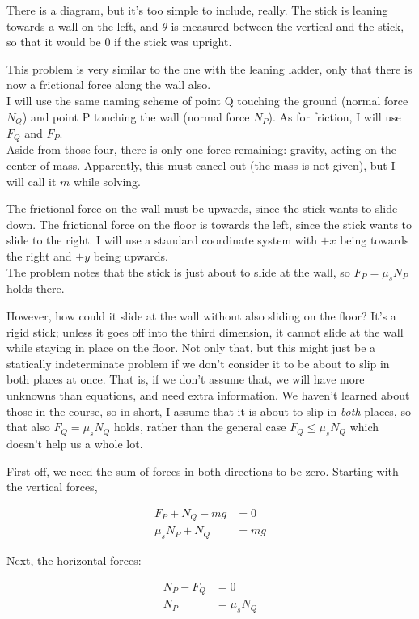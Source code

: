 \documentclass[8.01x]{subfiles}
\begin{document}
There is a diagram, but it's too simple to include, really. The stick is leaning towards a wall on the left, and $\theta$ is measured between the vertical and the stick, so that it would be 0 if the stick was upright.

This problem is very similar to the one with the leaning ladder, only that there is now a frictional force along the wall also.\\
I will use the same naming scheme of point Q touching the ground (normal force $N_Q$) and point P touching the wall (normal force $N_P$). As for friction, I will use $F_Q$ and $F_P$.\\
Aside from those four, there is only one force remaining: gravity, acting on the center of mass. Apparently, this must cancel out (the mass is not given), but I will call it $m$ while solving.

The frictional force on the wall must be upwards, since the stick wants to slide down. The frictional force on the floor is towards the left, since the stick wants to slide to the right. I will use a standard coordinate system with $+x$ being towards the right and $+y$ being upwards.\\
The problem notes that the stick is just about to slide at the wall, so $F_P = \mu_s N_P$ holds there.

However, how could it slide at the wall without also sliding on the floor? It's a rigid stick; unless it goes off into the third dimension, it cannot slide at the wall while staying in place on the floor. Not only that, but this might just be a statically indeterminate problem if we don't consider it to be about to slip in both places at once. That is, if we don't assume that, we will have more unknowns than equations, and need extra information. We haven't learned about those in the course, so in short, I assume that it is about to slip in \emph{both} places, so that also $F_Q = \mu_s N_Q$ holds, rather than the general case $F_Q \le \mu_s N_Q$ which doesn't help us a whole lot.

First off, we need the sum of forces in both directions to be zero. Starting with the vertical forces,

\begin{align}
F_P + N_Q - m g &= 0\\
\mu_s N_P + N_Q &= m g
\end{align}

Next, the horizontal forces:

\begin{align}
N_P - F_Q &= 0\\
N_P &= \mu_s N_Q
\end{align}
\end{document}
